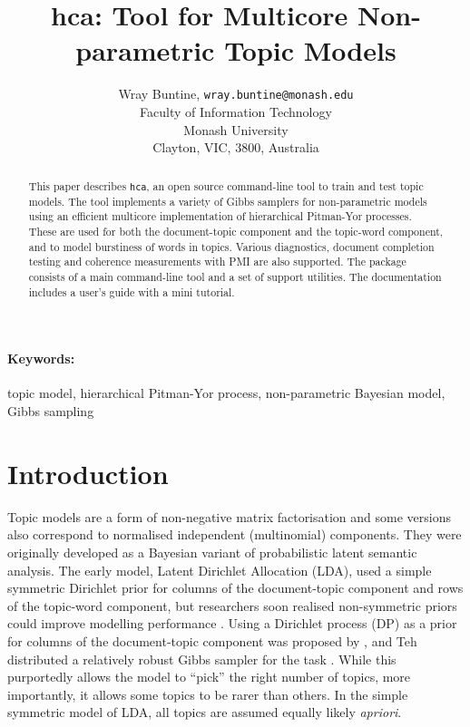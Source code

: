 \documentclass[twoside,11pt]{article}
\begin{document}
\title{hca: Tool for Multicore Non-parametric Topic Models}

\author{Wray Buntine, {\tt wray.buntine@monash.edu} \\
       Faculty of Information Technology \\
       Monash University\\
       Clayton, VIC, 3800, Australia}


\maketitle

\begin{abstract}%
This paper describes {\tt hca}, an open source command-line tool to
train and test topic models.  The tool implements a variety of Gibbs
samplers for non-parametric models using an efficient multicore
implementation
of hierarchical Pitman-Yor processes.  These are used for both the
document-topic component and the topic-word component, and to model
burstiness of words in topics.  Various diagnostics, document
completion testing and coherence measurements with PMI are also
supported.  The package consists of a main command-line tool
and a set of support utilities. The documentation includes a user's
guide with a mini tutorial.
\end{abstract}

\paragraph{Keywords:}
  topic model, hierarchical Pitman-Yor process, non-parametric Bayesian model,
  Gibbs sampling

\section{Introduction}
Topic models are a form of non-negative matrix factorisation
and some versions also correspond to normalised independent
(multinomial) components.
They were originally developed
as a Bayesian variant of probabilistic latent semantic analysis.
The early model, Latent Dirichlet Allocation (LDA),
used a simple symmetric Dirichlet prior for columns of the
document-topic component and rows of the topic-word component, but
researchers soon realised non-symmetric priors could
improve modelling performance \cite{wallach2009rethinking}.
Using a Dirichlet process (DP) as a prior
for columns of the document-topic component was proposed by
\cite{TehJorBea2006}, and Teh distributed a relatively robust Gibbs
sampler for the task \cite{TehNBMM21}.  While this
purportedly allows the
model to ``pick'' the right number of topics, more importantly,
it allows some topics to be rarer than others.
In the simple symmetric model of LDA,
all topics are assumed equally likely {\it apriori}.
\end{document}
